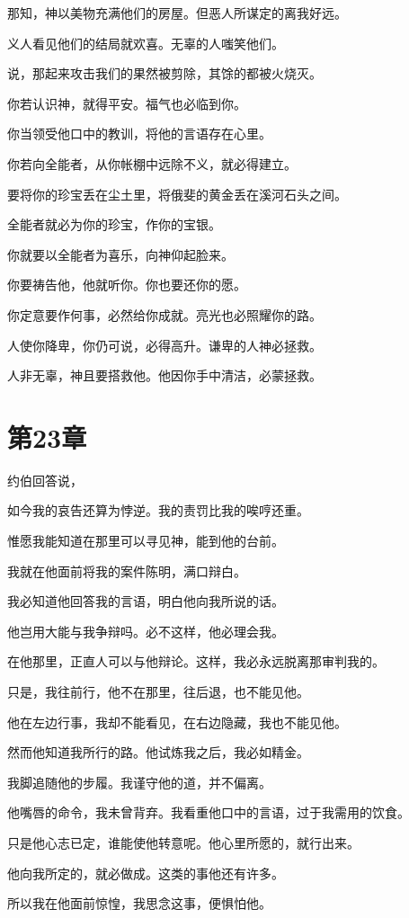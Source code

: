 \documentclass[12pt,oneside]{book}
\begin{document}
那知，神以美物充满他们的房屋。但恶人所谋定的离我好远。

义人看见他们的结局就欢喜。无辜的人嗤笑他们。

说，那起来攻击我们的果然被剪除，其馀的都被火烧灭。

你若认识神，就得平安。福气也必临到你。

你当领受他口中的教训，将他的言语存在心里。

你若向全能者，从你帐棚中远除不义，就必得建立。

要将你的珍宝丢在尘土里，将俄斐的黄金丢在溪河石头之间。

全能者就必为你的珍宝，作你的宝银。

你就要以全能者为喜乐，向神仰起脸来。

你要祷告他，他就听你。你也要还你的愿。

你定意要作何事，必然给你成就。亮光也必照耀你的路。

人使你降卑，你仍可说，必得高升。谦卑的人神必拯救。

人非无辜，神且要搭救他。他因你手中清洁，必蒙拯救。


\chapter{第23章}
约伯回答说，

如今我的哀告还算为悖逆。我的责罚比我的唉哼还重。

惟愿我能知道在那里可以寻见神，能到他的台前。

我就在他面前将我的案件陈明，满口辩白。

我必知道他回答我的言语，明白他向我所说的话。

他岂用大能与我争辩吗。必不这样，他必理会我。

在他那里，正直人可以与他辩论。这样，我必永远脱离那审判我的。

只是，我往前行，他不在那里，往后退，也不能见他。

他在左边行事，我却不能看见，在右边隐藏，我也不能见他。

然而他知道我所行的路。他试炼我之后，我必如精金。

我脚追随他的步履。我谨守他的道，并不偏离。

他嘴唇的命令，我未曾背弃。我看重他口中的言语，过于我需用的饮食。

只是他心志已定，谁能使他转意呢。他心里所愿的，就行出来。

他向我所定的，就必做成。这类的事他还有许多。

所以我在他面前惊惶，我思念这事，便惧怕他。
\end{document}
